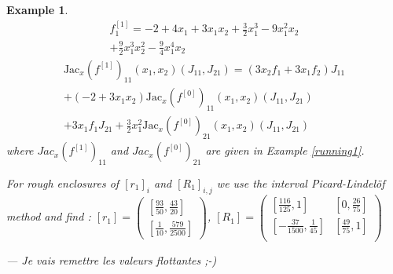 \documentclass{sig-alternate-05-2015} %
\newcommand\ForAuthors[1]%
 {\par\smallskip                     %
  \begin{center}%
   \fbox%
   {\parbox{0.9\linewidth}%
    {\raggedright\sc--- #1}%
   }%
  \end{center}%
  \par\smallskip                     %
 }
\newtheorem{example}{Example}
\def\int#1{\mbox{$[ #1 ]$}}
\begin{document}
\begin{example}
\begin{multline}
{f}_1^{[1]} = -2+4x_1+3x_1x_2+\frac{3}{2}x_1^3-9x_1^2x_2\\
+\frac{9}{2}x_1^3x_2^2-\frac{9}{4}x_1^4x_2
\end{multline}
\begin{multline}
\mbox{Jac}_x(f^{[1]})_{11}(x_1,x_2)(J_{11},J_{21}) = (3x_2f_1+3x_1f_2)J_{11}\\
+(-2+3x_1x_2)\mbox{Jac}_x(f^{[0]})_{11}(x_1,x_2)(J_{11},J_{21}) \\ 
+3x_1f_1J_{21}+\frac{3}{2}x_1^2{\mbox{Jac}_x(f^{[0]})}_{21}(x_1,x_2)(J_{11},J_{21}) 
\label{secondderivative}
\end{multline} %
\noindent where $Jac_x(f^{[1]})_{11}$ %
and ${Jac_x(f^{[0]})}_{21}$ %
are given in Example \ref{running1}.

For rough enclosures of $\int{r_1}_i$ and $\int{R_1}_{i,j}$ we use the interval Picard-Lindel\"of method and find : 
$\int{r_1} = \left(\begin{array}{c}
\left[\frac{93}{50}, \frac{43}{20}\right]\\
\left[\frac{1}{10}, \frac{579}{2500}\right]
\end{array}\right)$, 
$\int{R_1} =\left(\begin{array}{cc} 
\left[\frac{116}{125}, 1\right] & \left[0, \frac{26}{75}\right]\\
\left[-\frac{37}{1500}, \frac{1}{45}\right] & 
\left[\frac{49}{75}, 1\right] \\
\end{array}\right)$
\ForAuthors{Je vais remettre les valeurs flottantes ;-)}
\end{example}
\end{document}
